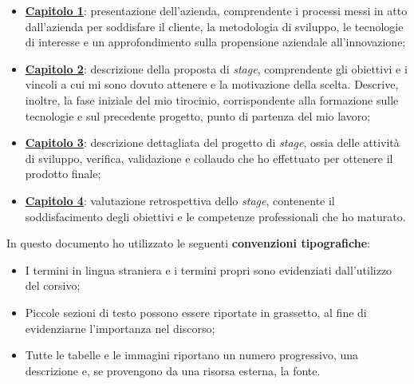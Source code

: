 \begin{itemize}
  \item \hyperref[cap:contesto-aziendale]{\textbf{Capitolo 1}}: presentazione dell'azienda, comprendente i processi messi in atto dall'azienda per soddisfare il cliente, la metodologia di sviluppo, le tecnologie di interesse e un approfondimento sulla propensione aziendale all'innovazione;
  \item \hyperref[cap:progetto-contesto-aziendale]{\textbf{Capitolo 2}}: descrizione della proposta di \textit{stage}, comprendente gli obiettivi e i vincoli a cui mi sono dovuto attenere e la motivazione della scelta. Descrive, inoltre, la fase iniziale del mio tirocinio, corrispondente alla formazione sulle tecnologie e sul precedente progetto, punto di partenza del mio lavoro;
  \item \hyperref[cap:progetto-stage]{\textbf{Capitolo 3}}: descrizione dettagliata del progetto di \textit{stage}, ossia delle attività di sviluppo, verifica, validazione e collaudo che ho effettuato per ottenere il prodotto finale;
  \item \hyperref[cap:valutazioni-retrospettive]{\textbf{Capitolo 4}}: valutazione retrospettiva dello \textit{stage}, contenente il soddisfacimento degli obiettivi e le competenze professionali che ho maturato.
\end{itemize}

In questo documento ho utilizzato le seguenti \textbf{convenzioni tipografiche}:
\begin{itemize}
  \item I termini in lingua straniera e i termini propri sono evidenziati dall'utilizzo del corsivo;
  \item Piccole sezioni di testo possono essere riportate in grassetto, al fine di evidenziarne l'importanza nel discorso;
  \item Tutte le tabelle e le immagini riportano un numero progressivo, una descrizione e, se provengono da una risorsa esterna, la fonte.
\end{itemize}


%
%

\endgroup

\vfill
